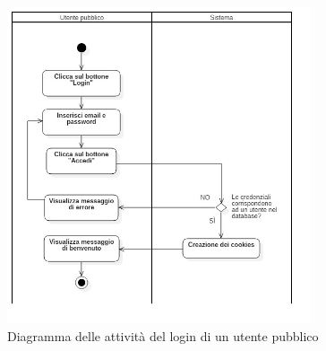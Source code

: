 	
	\begin{figure}[h]
		\centering
		\includegraphics[width=0.8\textwidth]
		{immagini/ad-login}
		
		\caption{Diagramma delle attività del login di un utente pubblico}
		\label{ad-login}
	\end{figure}